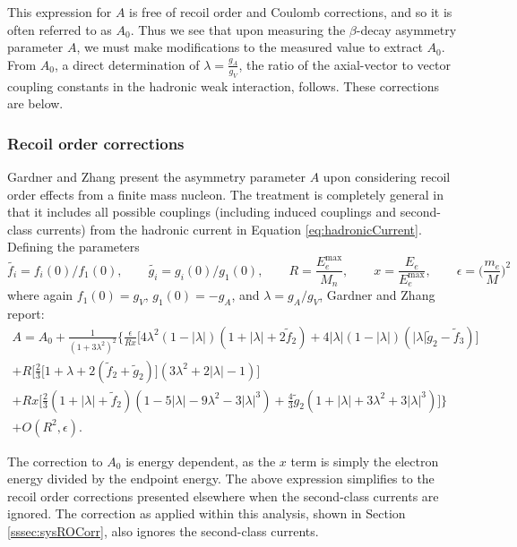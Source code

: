 This expression for $A$ is free of recoil order and Coulomb corrections, and so it is
often referred to as $A_0$. Thus we see that upon measuring the $\beta$-decay
asymmetry parameter $A$, we must make modifications to the measured value to extract
$A_0$. From $A_0$, a direct determination of $\lambda = \frac{g_A}{g_V}$, the ratio of the axial-vector to vector
coupling constants in the hadronic weak interaction, follows.
These corrections are below.

\subsubsection{Recoil order corrections}  \label{sssec:ROCorr}

Gardner and Zhang \cite{gardner2001} present the asymmetry parameter $A$ upon considering recoil order effects
from a finite mass nucleon. The treatment is completely general in that it includes all possible couplings
(including induced couplings and second-class currents) from the hadronic current in Equation
\ref{eq:hadronicCurrent}. Defining the parameters
%
\begin{equation*}
  \tilde{f_i}=f_i(0)/f_1(0),\qquad  \tilde{g_i}=g_i(0)/g_1(0), \qquad
  R=\frac{E^{\mathrm{max}}_e}{M_n}, \qquad x = \frac{E_e}{E^{\mathrm{max}}_e}, \qquad \epsilon=\Big(\frac{m_e}{M}\Big)^2
\end{equation*}
where again $f_1(0)=g_V$, $g_1(0)=-g_A$, and $\lambda=g_A/g_V$, Gardner and Zhang report:
%
\begin{multline}
  A = A_0 + \frac{1}{(1+3\lambda^2)^2}\Bigg\{\frac{\epsilon}{Rx}\Big[4\lambda^2
      (1-|\lambda|)(1+|\lambda|+2\tilde{f}_2)+4|\lambda|(1-|\lambda|)
      (|\lambda|\tilde{g}_2-\tilde{f}_3)\Big] \\
    + R\bigg[\frac{2}{3}\big[1+\lambda+2(\tilde{f}_2+\tilde{g}_2)\big]
      (3\lambda^2+2|\lambda|-1)\bigg] \\
      +Rx\bigg[\frac{2}{3}(1+|\lambda| + \tilde{f}_2)
        (1-5|\lambda|-9\lambda^2-3|\lambda|^3)
        +\frac{4}{3}\tilde{g}_2(1+|\lambda|+3\lambda^2+3|\lambda|^3)\bigg]\Bigg\} \\
  +O(R^2,\epsilon).
\end{multline}

The correction to $A_0$ is energy dependent, as the $x$ term is simply the electron energy divided by
the endpoint energy. The above expression simplifies to the recoil order corrections
presented elsewhere \cite{bilenkii1960,wilkinson1982} when the second-class currents
are ignored. The correction as applied within this analysis, shown in Section \ref{sssec:sysROCorr},
also ignores the second-class currents.

